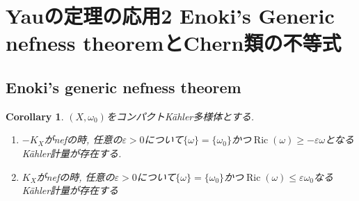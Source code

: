 \documentclass[dvipdfmx,a4paper,11pt]{article} %
\newtheorem{cor}[thm]{Corollary}
\theoremstyle{definition}
\theoremstyle{remark}
\numberwithin{equation}{section}
\DeclareMathOperator{\Ric}{Ric}
\begin{document}
 \newpage
 
 \section{Yauの定理の応用2 Enoki's Generic nefness theoremとChern類の不等式}
 
  \subsection{Enoki's generic nefness theorem}
  
 \begin{cor}
\label{cor-Yau-thm-2}
$(X, \omega_0)$をコンパクトK\"ahler多様体とする. 
\begin{enumerate}
\item $-K_X$がnefの時, 任意の$\varepsilon>0$について$\{ \omega\}=\{\omega_0\}$かつ$\Ric(\omega) \geq - \varepsilon \omega$となるK\"ahler計量が存在する.
\item $K_X$がnefの時, 任意の$\varepsilon>0$について$\{ \omega\}=\{\omega_0\}$かつ$\Ric(\omega) \leq \varepsilon \omega_0$なるK\"ahler計量が存在する
\end{enumerate}
\end{cor}
\end{document}
